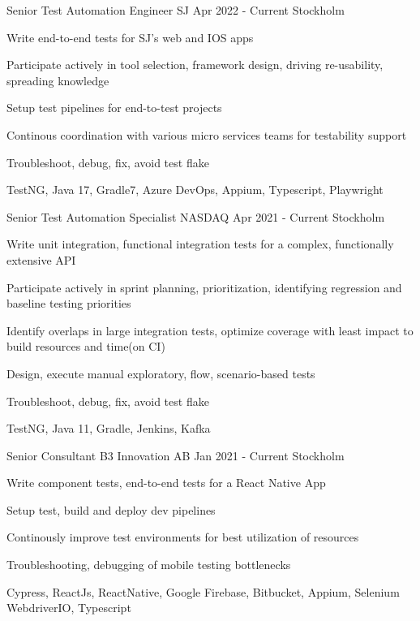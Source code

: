 \documentclass[11pt, a4paper]{awesome-cv}
\begin{document}
  \begin{cventries}

    \cventry
    {Senior Test Automation Engineer}
    {SJ}
    {Apr 2022 - Current}
    {Stockholm}
    {
      \begin{cvitems}
        \item Write end-to-end tests for SJ's web and IOS apps 
        \item Participate actively in tool selection, framework design, driving re-usability, spreading knowledge
        \item Setup test pipelines for end-to-test projects
        \item Continous coordination with various micro services teams for testability support
        \item Troubleshoot, debug, fix, avoid test flake
        \item TestNG, Java 17, Gradle7, Azure DevOps, Appium, Typescript, Playwright
      \end{cvitems}
    }

    \cventry
    {Senior Test Automation Specialist}
    {NASDAQ}
    {Apr 2021 - Current}
    {Stockholm}
    {
      \begin{cvitems}
        \item Write unit integration, functional integration tests for a complex, functionally extensive API 
        \item Participate actively in sprint planning, prioritization, identifying regression and baseline testing priorities
        \item Identify overlaps in large integration tests, optimize coverage with least impact to build resources and time(on CI)
        \item Design, execute manual exploratory, flow, scenario-based tests
        \item Troubleshoot, debug, fix, avoid test flake
        \item TestNG, Java 11, Gradle, Jenkins, Kafka
      \end{cvitems}
    }

    \cventry
    {Senior Consultant}
    {B3 Innovation AB}
    {Jan 2021 - Current}
    {Stockholm}
    {
      \begin{cvitems}
        \item Write component tests, end-to-end tests for a React Native App 
        \item Setup test, build and deploy dev pipelines
        \item Continously improve test environments for best utilization of resources
        \item Troubleshooting, debugging of mobile testing bottlenecks
        \item Cypress, ReactJs, ReactNative, Google Firebase, Bitbucket, Appium, Selenium WebdriverIO, Typescript
      \end{cvitems}
    }


\end{cventries}
\end{document}

